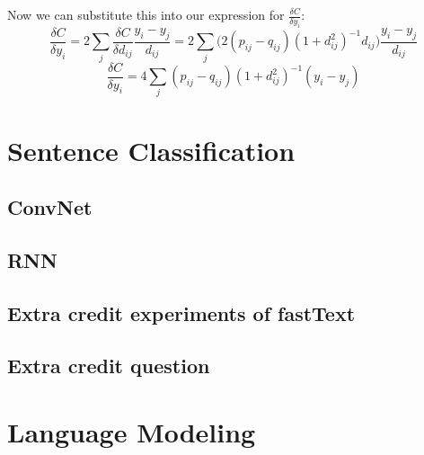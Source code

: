 \documentclass[a4paper]{article}
\begin{document}
\begin{enumerate}
{Now we can substitute this into our expression for $\frac{\delta C }{\delta y_i}$:
$$\frac{\delta C }{\delta y_i} = 2 \sum_j  \frac{\delta C }{\delta d_{ij}}  \frac{y_i - y_j}{ d_{ij} } = 2 \sum_j  \Big( 2 (p_{ij} - q_{ij}) (1+d_{ij}^2)^{-1}  d_{ij}  \Big) \frac{y_i - y_j}{ d_{ij} }$$
$$\frac{\delta C }{\delta y_i}  = 4 \sum_j  (p_{ij} - q_{ij}) (1+d_{ij}^2)^{-1} (y_i - y_j)$$

}
\end{enumerate}

\section{Sentence Classification}

\subsection{ConvNet}

\subsection{RNN}

\subsection{Extra credit experiments of fastText}

\subsection{Extra credit question}

\section{Language Modeling}
\end{document}
